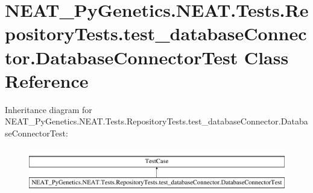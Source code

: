\hypertarget{classNEAT__PyGenetics_1_1NEAT_1_1Tests_1_1RepositoryTests_1_1test__databaseConnector_1_1DatabaseConnectorTest}{}\section{N\+E\+A\+T\+\_\+\+Py\+Genetics.\+N\+E\+A\+T.\+Tests.\+Repository\+Tests.\+test\+\_\+database\+Connector.\+Database\+Connector\+Test Class Reference}
\label{classNEAT__PyGenetics_1_1NEAT_1_1Tests_1_1RepositoryTests_1_1test__databaseConnector_1_1DatabaseConnectorTest}
Inheritance diagram for N\+E\+A\+T\+\_\+\+Py\+Genetics.\+N\+E\+A\+T.\+Tests.\+Repository\+Tests.\+test\+\_\+database\+Connector.\+Database\+Connector\+Test\+:\begin{figure}[H]
\begin{center}
\leavevmode
\includegraphics[height=1.978799cm]{classNEAT__PyGenetics_1_1NEAT_1_1Tests_1_1RepositoryTests_1_1test__databaseConnector_1_1DatabaseConnectorTest}
\end{center}
\end{figure}
